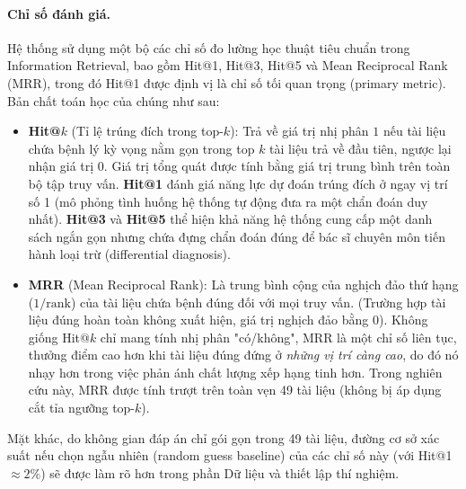 \paragraph{Chỉ số đánh giá.}
Hệ thống sử dụng một bộ các chỉ số đo lường học thuật tiêu chuẩn trong Information Retrieval, bao gồm Hit@1, Hit@3, Hit@5 và Mean Reciprocal Rank (MRR), trong đó Hit@1 được định vị là chỉ số tối quan trọng (primary metric). Bản chất toán học của chúng như sau:
\begin{itemize}[leftmargin=1.4em,itemsep=2pt]
    \item \textbf{Hit@$k$} (Tỉ lệ trúng đích trong top-$k$): Trả về giá trị nhị phân $1$ nếu tài liệu chứa bệnh lý kỳ vọng nằm gọn trong top $k$ tài liệu trả về đầu tiên, ngược lại nhận giá trị $0$. Giá trị tổng quát được tính bằng giá trị trung bình trên toàn bộ tập truy vấn. \textbf{Hit@1} đánh giá năng lực dự đoán trúng đích ở ngay vị trí số 1 (mô phỏng tình huống hệ thống tự động đưa ra một chẩn đoán duy nhất). \textbf{Hit@3} và \textbf{Hit@5} thể hiện khả năng hệ thống cung cấp một danh sách ngắn gọn nhưng chứa đựng chẩn đoán đúng để bác sĩ chuyên môn tiến hành loại trừ (differential diagnosis).
    \item \textbf{MRR} (Mean Reciprocal Rank): Là trung bình cộng của nghịch đảo thứ hạng ($1/\mathrm{rank}$) của tài liệu chứa bệnh đúng đối với mọi truy vấn. (Trường hợp tài liệu đúng hoàn toàn không xuất hiện, giá trị nghịch đảo bằng $0$). Không giống Hit@$k$ chỉ mang tính nhị phân "có/không", MRR là một chỉ số liên tục, thưởng điểm cao hơn khi tài liệu đúng đứng ở \textit{những vị trí càng cao}, do đó nó nhạy hơn trong việc phản ánh chất lượng xếp hạng tinh hơn. Trong nghiên cứu này, MRR được tính trượt trên toàn vẹn 49 tài liệu (không bị áp dụng cắt tỉa ngưỡng top-$k$).
\end{itemize}
Mặt khác, do không gian đáp án chỉ gói gọn trong 49 tài liệu, đường cơ sở xác suất nếu chọn ngẫu nhiên (random guess baseline) của các chỉ số này (với Hit@1 $\approx 2\%$) sẽ được làm rõ hơn trong phần Dữ liệu và thiết lập thí nghiệm.
